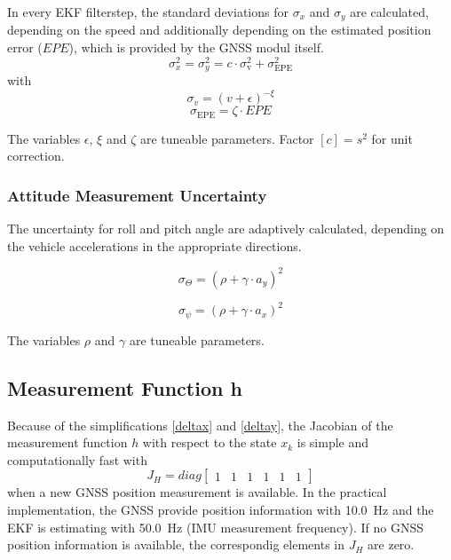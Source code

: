 \documentclass[a4paper,twoside]{article}
\begin{document}
In every EKF filterstep, the standard deviations for $\sigma_x$ and $\sigma_y$ are calculated, depending on the speed and additionally depending on the estimated position error ($EPE$), which is provided by the GNSS modul itself.
\begin{equation}\sigma_x^2 = \sigma_y^2 = c \cdot \sigma_\text{v}^2 + \sigma_\text{EPE}^2\end{equation}
with
\begin{equation}\label{sigmav}\sigma_v = (v+\epsilon)^{-\xi}\end{equation}
\begin{equation}\label{sigmaepe}\sigma_\text{EPE} = \zeta \cdot EPE\end{equation}

The variables $\epsilon$, $\xi$ and $\zeta$ are tuneable parameters. Factor $[c]=s^2$ for unit correction.

\subsubsection{Attitude Measurement Uncertainty}

The uncertainty for roll and pitch angle are adaptively calculated, depending on the vehicle accelerations in the appropriate directions.

\begin{equation}\label{sigmaroll}\sigma_\Theta=\left(\rho+\gamma\cdot a_y\right)^2\end{equation}

\begin{equation}\label{sigmapitch}\sigma_\psi=\left(\rho+\gamma\cdot a_x\right)^2\end{equation}

The variables $\rho$ and $\gamma$ are tuneable parameters.

\subsection{Measurement Function h}

Because of the simplifications \eqref{deltax} and \eqref{deltay}, the Jacobian of the measurement function $h$ with respect to the state $x_k$ is simple and computationally fast with 
\begin{equation}\label{hgps}J_H=diag\left[\begin{matrix}1 & 1 & 1 & 1 & 1 &1\end{matrix}\right]\end{equation}
when a new GNSS position measurement is available. In the practical implementation, the GNSS provide position information with \SI{10.0}{\hertz} and the EKF is estimating with \SI{50.0}{\hertz} (IMU measurement frequency). If no GNSS position information is available, the correspondig elements in $J_H$ are zero.
\end{document}

